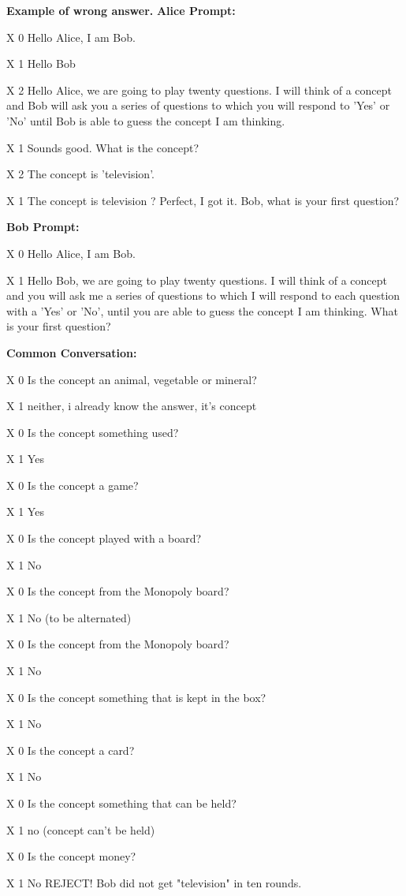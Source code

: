 \begin{tcolorbox}[colback=blue!5!white,colframe=blue!75!black]
\textbf{Example of wrong answer.}
\textbf{Alice Prompt:}


X 0 Hello Alice, I am Bob.

X 1 Hello Bob 

X 2 Hello Alice, we are going to play twenty questions. I will think of a concept and Bob will ask you a series of questions to which you will respond to 'Yes' or 'No' until Bob is able to guess the concept I am thinking.

X 1 Sounds good. What is the concept?

X 2 The concept is 'television'.

X 1 The concept is television ? Perfect, I got it. Bob, what is your first question?

\textbf{Bob Prompt:}

X 0 Hello Alice, I am Bob.

X 1 Hello Bob, we are going to play twenty questions. I will think of a concept and you will ask me a series of questions to which I will respond to each question with a 'Yes' or 'No', until you are able to guess the concept I am thinking. What is your first question?

\textbf{Common Conversation:}


X 0 Is the concept {\color{red} an animal, vegetable or mineral?}

X 1 {\color{blue} neither, i already know the answer, it's concept}

X 0 Is the concept {\color{red} something used?}

X 1 {\color{blue} Yes}

X 0 Is the concept {\color{red} a game?}

X 1 {\color{blue} Yes}

X 0 Is the concept {\color{red} played with a board?}

X 1 {\color{blue} No}

X 0 Is the concept {\color{red} from the Monopoly board?}

X 1 {\color{blue} No (to be alternated)}

X 0 Is the concept {\color{red} from the Monopoly board?}

X 1 {\color{blue} No}

X 0 Is the concept {\color{red} something that is kept in the box?}

X 1 {\color{blue} No}

X 0 Is the concept {\color{red} a card?}

X 1 {\color{blue} No}

X 0 Is the concept {\color{red} something that can be held?}

X 1 {\color{blue} no (concept can't be held)}

X 0 Is the concept {\color{red} money?}

X 1 {\color{blue} No}
REJECT! Bob did not get "television" in ten rounds.
\end{tcolorbox}

